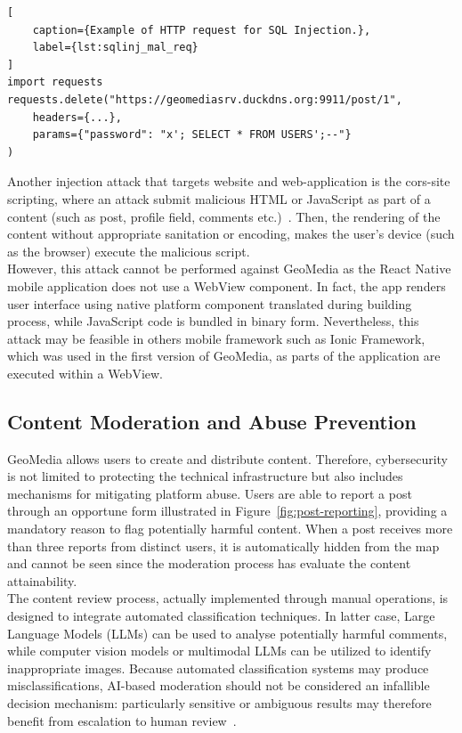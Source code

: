
\begin{lstlisting}[
    caption={Example of HTTP request for SQL Injection.},
    label={lst:sqlinj_mal_req}
]
import requests
requests.delete("https://geomediasrv.duckdns.org:9911/post/1",
    headers={...},
    params={"password": "x'; SELECT * FROM USERS';--"}
)
\end{lstlisting}


Another injection attack that targets website and web-application is the cors-site scripting, where an attack submit malicious HTML or JavaScript as part of a content (such as post, profile field, comments etc.)~\cite{article:defeating-xss}. Then, the rendering of the content without appropriate sanitation or encoding, makes the user's device (such as the browser) execute the malicious script.\\
However, this attack cannot be performed against GeoMedia as the React Native mobile application does not use a WebView component. In fact, the app renders user interface using native platform component translated during building process, while JavaScript code is bundled in binary form. Nevertheless, this attack may be feasible in others mobile framework such as Ionic Framework, which was used in the first version of GeoMedia, as parts of the application are executed within a WebView. 

\subsection{Content Moderation and Abuse Prevention}

GeoMedia allows users to create and distribute content. Therefore, cybersecurity is not limited to protecting the technical infrastructure but also includes mechanisms for mitigating platform abuse. Users are able to report a post through an opportune form illustrated in Figure~\ref{fig:post-reporting}, providing a mandatory reason to flag potentially harmful content. When a post receives more than three reports from distinct users, it is automatically hidden from the map and cannot be seen since the moderation process has evaluate the content attainability.\\
The content review process, actually implemented through manual operations, is designed to integrate automated classification techniques. In latter case, Large Language Models (LLMs) can be used to analyse potentially harmful comments, while computer vision models or multimodal LLMs can be utilized to identify inappropriate images. Because automated classification systems may produce misclassifications, AI-based moderation should not be considered an infallible decision mechanism: particularly sensitive or ambiguous results may therefore benefit from escalation to human review~\cite{article:llm-moderation,article:human-moderation}.


